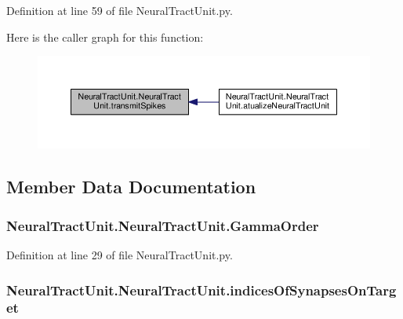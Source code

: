 Definition at line 59 of file Neural\-Tract\-Unit.\-py.



Here is the caller graph for this function\-:\nopagebreak
\begin{figure}[H]
\begin{center}
\leavevmode
\includegraphics[width=350pt]{class_neural_tract_unit_1_1_neural_tract_unit_a1c44e3b23ebda745d84d88c015c1cb25_icgraph}
\end{center}
\end{figure}




\subsection{Member Data Documentation}
\hypertarget{class_neural_tract_unit_1_1_neural_tract_unit_aee01a134ce97127783d75757ec15f352}{
\subsubsection[{Gamma\-Order}]{\setlength{\rightskip}{0pt plus 5cm}Neural\-Tract\-Unit.\-Neural\-Tract\-Unit.\-Gamma\-Order}}\label{class_neural_tract_unit_1_1_neural_tract_unit_aee01a134ce97127783d75757ec15f352}


Definition at line 29 of file Neural\-Tract\-Unit.\-py.

\hypertarget{class_neural_tract_unit_1_1_neural_tract_unit_a4e5fa20e16e924e7f27a087e8f7a19a7}{
\subsubsection[{indices\-Of\-Synapses\-On\-Target}]{\setlength{\rightskip}{0pt plus 5cm}Neural\-Tract\-Unit.\-Neural\-Tract\-Unit.\-indices\-Of\-Synapses\-On\-Target}}\label{class_neural_tract_unit_1_1_neural_tract_unit_a4e5fa20e16e924e7f27a087e8f7a19a7}


